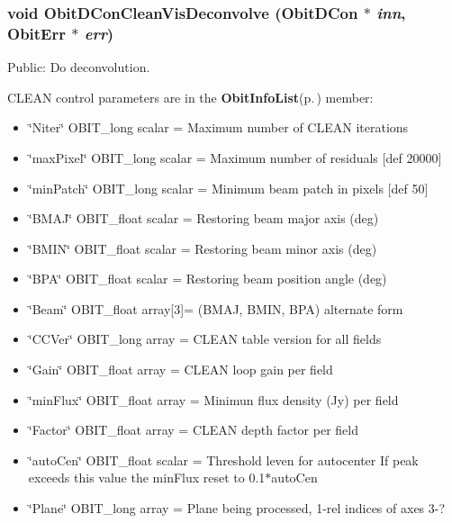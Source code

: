 \subsubsection{\setlength{\rightskip}{0pt plus 5cm}void Obit\-DCon\-Clean\-Vis\-Deconvolve ({\bf Obit\-DCon} $\ast$ {\em inn}, {\bf Obit\-Err} $\ast$ {\em err})}\label{ObitDConCleanVis_8c_a18}


Public: Do deconvolution. 

CLEAN control parameters are in the {\bf Obit\-Info\-List}{\rm (p.\,\pageref{structObitInfoList})} member: \begin{itemize}
\item \char`\"{}Niter\char`\"{} OBIT\_\-long scalar = Maximum number of CLEAN iterations \item \char`\"{}max\-Pixel\char`\"{} OBIT\_\-long scalar = Maximum number of residuals [def 20000] \item \char`\"{}min\-Patch\char`\"{} OBIT\_\-long scalar = Minimum beam patch in pixels [def 50] \item \char`\"{}BMAJ\char`\"{} OBIT\_\-float scalar = Restoring beam major axis (deg) \item \char`\"{}BMIN\char`\"{} OBIT\_\-float scalar = Restoring beam minor axis (deg) \item \char`\"{}BPA\char`\"{} OBIT\_\-float scalar = Restoring beam position angle (deg) \item \char`\"{}Beam\char`\"{} OBIT\_\-float array[3]= (BMAJ, BMIN, BPA) alternate form \item \char`\"{}CCVer\char`\"{} OBIT\_\-long array = CLEAN table version for all fields \item \char`\"{}Gain\char`\"{} OBIT\_\-float array = CLEAN loop gain per field \item \char`\"{}min\-Flux\char`\"{} OBIT\_\-float array = Minimun flux density (Jy) per field \item \char`\"{}Factor\char`\"{} OBIT\_\-float array = CLEAN depth factor per field \item \char`\"{}auto\-Cen\char`\"{} OBIT\_\-float scalar = Threshold leven for autocenter If peak exceeds this value the min\-Flux reset to 0.1$\ast$auto\-Cen \item \char`\"{}Plane\char`\"{} OBIT\_\-long array = Plane being processed, 1-rel indices of axes 3-? 
\end{itemize}
